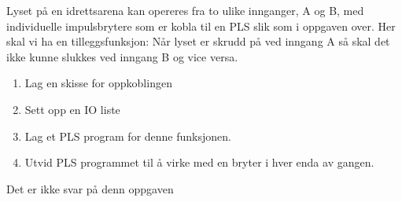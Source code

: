 


Lyset på en idrettsarena kan opereres fra to ulike innganger, A og B, med individuelle impulsbrytere som er kobla til en PLS slik som i oppgaven over. Her skal vi ha en tilleggsfunksjon: Når lyset er skrudd på ved inngang A så skal det ikke kunne slukkes ved inngang B og vice versa. 
\begin{enumerate}
\item Lag en skisse for oppkoblingen
\item Sett opp en IO liste
\item Lag et PLS program for denne funksjonen.
\item Utvid PLS programmet til å virke med en bryter i hver enda av gangen. 
\end{enumerate}
\vskip 10pt





Det er ikke svar på denn oppgaven













